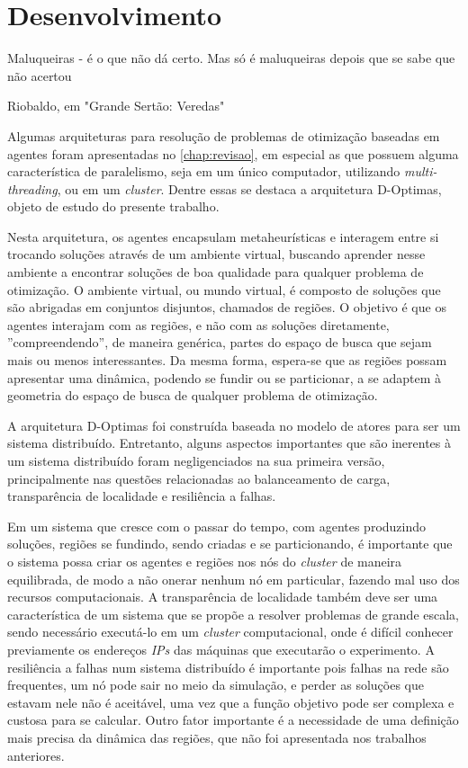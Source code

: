 

\chapter{Desenvolvimento}
\label{chap:desenvolvimento}

\epigraph{Maluqueiras - é o que não dá certo. Mas só é maluqueiras depois que se sabe que não acertou}{Riobaldo, em "Grande Sertão: Veredas"}

Algumas arquiteturas para resolução de problemas de otimização baseadas em agentes foram apresentadas no \autoref{chap:revisao}, em especial as que possuem alguma característica de paralelismo, seja em um único computador, utilizando \textit{multi-threading}, ou em um \textit{cluster}. Dentre essas se destaca a arquitetura D-Optimas, objeto de estudo do presente trabalho. 

Nesta arquitetura, os agentes encapsulam metaheurísticas e interagem entre si trocando soluções através de um ambiente virtual, buscando aprender nesse ambiente a encontrar soluções de boa qualidade para qualquer problema de otimização. O ambiente virtual, ou mundo virtual, é composto de soluções que são abrigadas em conjuntos disjuntos, chamados de regiões. O objetivo é que os agentes interajam com as regiões, e não com as soluções diretamente, ''compreendendo'', de maneira genérica, partes do espaço de busca que sejam mais ou menos interessantes. Da mesma forma, espera-se que as regiões possam apresentar uma dinâmica, podendo se fundir ou se particionar, a se adaptem à geometria do espaço de busca de qualquer problema de otimização.   

A arquitetura D-Optimas foi construída baseada no modelo de atores para ser um sistema distribuído. Entretanto, alguns aspectos importantes que são inerentes à um sistema distribuído foram negligenciados na sua primeira versão, principalmente nas questões relacionadas ao balanceamento de carga, transparência de localidade e resiliência a falhas.

Em um sistema que cresce com o passar do tempo, com agentes produzindo soluções, regiões se fundindo, sendo criadas e se particionando, é importante que o sistema possa criar os agentes e regiões nos nós do \textit{cluster} de maneira equilibrada, de modo a não onerar nenhum nó em particular, fazendo mal uso dos recursos computacionais. A transparência de localidade também deve ser uma característica de um sistema que se propõe a resolver problemas de grande escala, sendo necessário executá-lo em um \textit{cluster} computacional, onde é difícil conhecer previamente os endereços \textit{IPs} das máquinas que executarão o experimento. A resiliência a falhas num sistema distribuído é importante pois falhas na rede são frequentes, um nó pode sair no meio da simulação, e perder as soluções que estavam nele não é aceitável, uma vez que a função objetivo pode ser complexa e custosa para se calcular.
Outro fator importante é a necessidade de uma definição mais precisa da dinâmica das regiões,  que não foi apresentada nos trabalhos anteriores.


